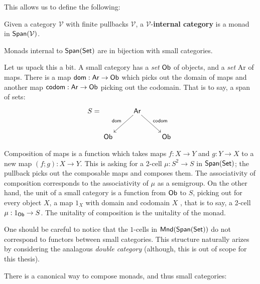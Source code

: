 This allows us to define the following:

\begin{definition}
\label{def:internalcat}

Given a category $\mathcal V$ with finite pullbacks $\mathcal V$, a $\mathcal V$-{\bf internal category} is a monad in $\mathsf{Span}(\mathcal V)$.
\end{definition}


\begin{example}
\label{ex:internalcat}
Monads internal to $\mathsf{Span}(\mathsf{Set})$ are in bijection with small categories.
\end{example}

Let us upack this a bit.  A small category has a {\em set} $\sf Ob$ of objects, and a {\em set} {\sf Ar} of maps.  There is a map ${\sf dom}:{\sf Ar}\to {\sf Ob}$ which picks out the domain of maps and another map  ${\sf codom}:{\sf Ar}\to {\sf Ob}$ picking out the codomain.  That is to say, a span of sets:
$$
S=\xymatrix{
& {\sf Ar} \ar[dl]_{{\sf dom}} \ar[dr]^{\sf codom}\\
{\sf Ob} & & {\sf Ob}
}
$$

Composition of maps is a function which takes maps $f:X\to Y$ and $g:Y\to X$ to a new map $(f;g):X\to Y$.   This is asking for a 2-cell $\mu:S^2\to S$ in $\mathsf{Span}(\mathsf{Set})$; the pullback picks out the composable maps and composes them.  The associativity of composition corresponds to the associativity of $\mu$ as a semigroup.
On the other hand, the unit of a small category is a function from ${\sf Ob}$ to $S$, picking out for every object $X$, a map $1_X$ with domain and codomain $X$ , that is to say, a 2-cell $\mu:1_{\sf Ob}\to S$.  The unitality of composition is the unitality of the monad.

One should be careful to notice that the $1$-cells in ${\sf Mnd}(\mathsf{Span}(\mathsf{Set}))$ do not correspond to functors between small categories.  This structure naturally arizes by considering the analagous {\em double category} (although, this is out of scope for this thesis).


There is a canonical way to compose monads, and thus small categories:

